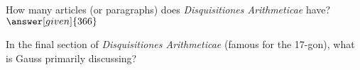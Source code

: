 \documentclass[nooutcomes]{ximera}
\begin{document}
\begin{question}
How many articles (or paragraphs) does {\em  Disquisitiones Arithmeticae} have? $\answer[given]{366}$
\end{question}

\begin{question}
In the final section of {\em  Disquisitiones Arithmeticae} (famous for the 17-gon), what is Gauss primarily discussing?
\begin{multipleChoice}
\end{multipleChoice}
\end{question}

%
%
\end{document}
